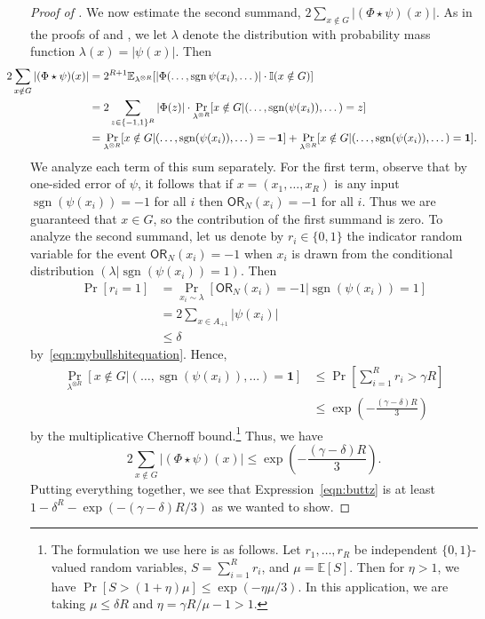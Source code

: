 \documentclass[11pt, letterpaper, fleqn]{article}
\theoremstyle{plain}
\newcommand{\E}{\mathbb{E}}
\newcommand{\sgn}{\mathrm{sign}}
\newcommand{\OR}{\mathsf{ OR}}
\newcommand{\bits}{\{-1,1\}}
\newcommand{\ls}{\star}
\renewcommand{\sgn}{\operatorname{sgn}}
\begin{document}
\begin{proof}[Proof of ]
We now estimate the second summand, $2 \sum_{x \notin G} |(\Phi \ls \psi)(x)|$. As in the proofs of  and , we let $\lambda$ denote the distribution with probability mass function $\lambda(x) = |\psi(x)|$. Then
\begin{align*}\hspace{-2.2em}
2\sum_{x \notin G} |(\Phi \ls \psi)(x)| &= 2^{R+1} \E_{\lambda^{\otimes R}} [|\Phi(\dots, \sgn \psi(x_i), \dots)| \cdot \mathbb{I}(x \notin G)] \\
&= 2\sum_{z \in \bits^R} |\Phi(z)| \cdot \Pr_{\lambda^{\otimes R}}[x \notin G | (\dots, \sgn(\psi(x_i)), \dots) = z] \\
&= \Pr_{\lambda^{\otimes R}}[x \notin G | (\dots, \sgn(\psi(x_i)), \dots) = \mathbf{-1}] + \Pr_{\lambda^{\otimes R}}[x \notin G | (\dots, \sgn(\psi(x_i)), \dots) = \mathbf{1}].
\end{align*}
We analyze each term of this sum separately. For the first term, observe that by one-sided error of $\psi$, it follows that if $x = (x_1, \dots, x_R)$ is any input $\sgn(\psi(x_i)) = -1$ for all $i$ then $\OR_N(x_i) = -1$ for all $i$. Thus we are guaranteed that $x \in G$, so the contribution of the first summand is zero. To analyze the second summand, let us denote by $r_i \in \{0, 1\}$ the indicator random variable for the event $\OR_N(x_i) = -1$ when $x_i$ is drawn from the conditional distribution $(\lambda | \sgn(\psi(x_i)) = 1)$. Then
\begin{align*}
\Pr[r_i = 1] &= \Pr_{x_i \sim \lambda}[\OR_N(x_i) = -1 | \sgn(\psi(x_i)) = 1] \\
&= 2\sum_{x \in A_{+1}} |\psi(x_i)| \\
&\le \delta
\end{align*}
by~\eqref{eqn:mybullshitequation}. Hence,
\begin{align*}
 \Pr_{\lambda^{\otimes R}}[x \notin G | (\dots, \sgn(\psi(x_i)), \dots) = \mathbf{1}] &\le \Pr\left[ \sum_{i = 1}^R r_i  > \gamma R\right] \\
 &\le \exp\left(-\frac{(\gamma - \delta)R}{3}\right)
\end{align*}
by the multiplicative Chernoff bound.\footnote{The formulation we use here is as follows. Let $r_1, \dots, r_R$ be independent $\{0, 1\}$-valued random variables, $S = \sum_{i=1}^R r_i$, and $\mu = \E[S]$. Then for $\eta > 1$, we have $\Pr[S > (1+\eta) \mu] \le \exp(-\eta \mu / 3)$. In this application, we are taking $\mu \le \delta R$ and $\eta = \gamma R / \mu - 1 > 1$.} Thus, we have
\[2 \sum_{x \notin G} |(\Phi \ls \psi)(x)| \le \exp\left(-\frac{(\gamma - \delta)R}{3}\right).\]
Putting everything together, we see that Expression~\eqref{eqn:buttz} is at least $1 - \delta^R - \exp\left(-(\gamma - \delta) R / 3\right)$ as we wanted to show.
\end{proof}
\end{document}
